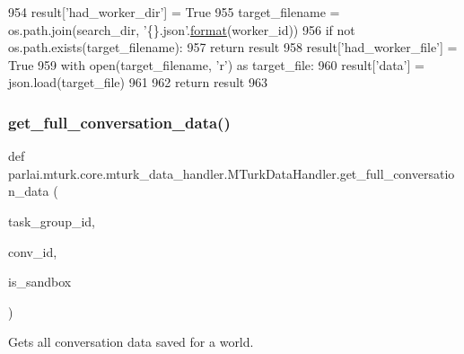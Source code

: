 \begin{DoxyCode}
954         result[\textcolor{stringliteral}{'had\_worker\_dir'}] = \textcolor{keyword}{True}
955         target\_filename = os.path.join(search\_dir, \textcolor{stringliteral}{'\{\}.json'}.\hyperlink{namespaceparlai_1_1chat__service_1_1services_1_1messenger_1_1shared__utils_a32e2e2022b824fbaf80c747160b52a76}{format}(worker\_id))
956         \textcolor{keywordflow}{if} \textcolor{keywordflow}{not} os.path.exists(target\_filename):
957             \textcolor{keywordflow}{return} result
958         result[\textcolor{stringliteral}{'had\_worker\_file'}] = \textcolor{keyword}{True}
959         with open(target\_filename, \textcolor{stringliteral}{'r') as target\_file:}
960 \textcolor{stringliteral}{            result['data'}] = json.load(target\_file)
961 
962         \textcolor{keywordflow}{return} result
963 
\end{DoxyCode}
\mbox{\label{classparlai_1_1mturk_1_1core_1_1mturk__data__handler_1_1MTurkDataHandler_aac3142a54b238e4d6b976ce657b5f7ac}} 
\subsubsection{\texorpdfstring{get\+\_\+full\+\_\+conversation\+\_\+data()}{get\_full\_conversation\_data()}}
{\footnotesize\ttfamily def parlai.\+mturk.\+core.\+mturk\+\_\+data\+\_\+handler.\+M\+Turk\+Data\+Handler.\+get\+\_\+full\+\_\+conversation\+\_\+data (\begin{DoxyParamCaption}\item[{}]{task\+\_\+group\+\_\+id,  }\item[{}]{conv\+\_\+id,  }\item[{}]{is\+\_\+sandbox }\end{DoxyParamCaption})\hspace{0.3cm}{\ttfamily [static]}}

\begin{DoxyVerb}Gets all conversation data saved for a world.
\end{DoxyVerb}
 

